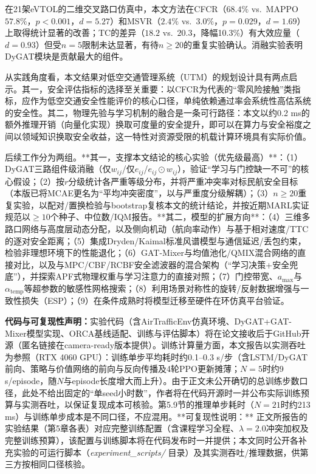 \documentclass[12pt,a4paper,UTF8]{ctexart}
\begin{document}
在21架eVTOL的二维交叉路口仿真中，本文方法在CFCR（$68.4\%$ vs.\ MAPPO $57.8\%$，$p<0.001$，$d=5.27$）和MSVR（$2.4\%$ vs.\ $3.0\%$，$p=0.029$，$d=1.69$）上取得统计显著的改善；TC的差异（$18.2$ vs.\ $20.3$，降幅10.3\%）有大效应量（$d=0.93$）但受$n=5$限制未达显著，有待$n\geq20$的重复实验确认。消融实验表明DyGAT模块是贡献最大的组件。

从实践角度看，本文结果对低空交通管理系统（UTM）的规划设计具有两点启示。其一，安全评估指标的选择至关重要：以CFCR为代表的“零风险接触”类指标，应作为低空交通安全性能评价的核心口径，单纯依赖通过率会系统性高估系统的安全性。其二，物理先验与学习机制的融合是一条可行路径：本文以约0.2 ms的额外推理开销（向量化实现）换取可度量的安全提升，即可以在算力与安全裕度之间以领域知识换取安全收益，这一特性对资源受限的机载计算环境具有实际价值。

后续工作分为两组。**其一，支撑本文结论的核心实验（优先级最高）**：（1）DyGAT三路组件级消融（仅$w_{ij}$/仅$e_{ij}$/$e_{ij}\odot w_{ij}$），验证“学习与门控缺一不可”的核心假设；（2）按$r$分级统计各严重等级分布，并将严重冲突率对标民航安全目标（本版已将MCAE更名为“平均冲突密度”，以与严重度分级解耦）；（3）$n\geq20$重复实验，以配对/置换检验与bootstrap复核本文的统计结论，并按近期MARL实证规范\cite{ref59}以$\geq10$个种子、中位数/IQM报告。**其二，模型的扩展方向**：（4）三维多路口网络与高度层动态分配，以及侧向机动（航向率动作）与基于相对速度/TTC的逐对安全距离；（5）集成Dryden/Kaimal标准风谱模型与通信延迟/丢包约束，检验非理想环境下的性能退化；（6）GAT-Mixer与均值池化/QMIX混合网络的直接对比，以及与MPC/CBF/RCBF安全滤波器的混合架构（“学习决策+安全兜底”），并探索APF式物理权重与学习注意力的直接对照；（7）门控带宽、$a_{\max}$与$\alpha_{\text{temp}}$等超参数的敏感性网格搜索；（8）利用场景对称性的旋转/反射数据增强与一致性损失（ESP\cite{ref57}）；（9）在条件成熟时将模型迁移至硬件在环仿真平台验证。

\textbf{代码与可复现性声明：}实验代码（含AirTrafficEnv仿真环境、DyGAT+GAT-Mixer模型实现、ORCA基线适配、训练与评估脚本）将在论文接收后于GitHub开源（匿名链接在camera-ready版本提供）。训练计算量方面，本文报告以实测吞吐为参照（RTX 4060 GPU）：训练单步平均耗时约0.1--0.3 s/步（含LSTM/DyGAT前向、策略与价值网络的前向与反向传播及4轮PPO更新摊薄；$N=5$时约9 s/episode，随$N$与episode长度增大而上升）。由于正文未公开确切的总训练步数口径，此处不给出固定的“单seed小时数”，作者将在代码开源时一并公布实际训练预算与实测吞吐，以保证复现成本可核验。第5.9节的推理单步耗时（$N=21$时约213 ms）与训练单步成本是不同口径，不应混用。**可复现性说明：** 正文所报告的实验结果（第5章各表）对应完整训练配置（含课程学习全程、$\lambda=2.0$冲突加权及完整训练预算），该配置与训练脚本将在代码发布时一并提供；本文同时公开各补充实验的可运行脚本（\textit{experiment\_scripts/} 目录）及其实测吞吐/推理数据，供第三方按相同口径核验。
\end{document}

